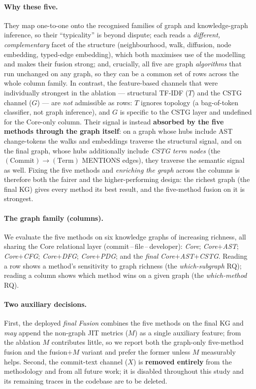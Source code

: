 \documentclass[11pt,a4paper]{article}
\newcommand{\edge}[1]{\textsc{#1}}
\begin{document}
	\paragraph{Why these five.} They map one-to-one onto the recognised families of
	graph and knowledge-graph inference, so their ``typicality'' is beyond dispute;
	each reads a \emph{different, complementary} facet of the structure
	(neighbourhood, walk, diffusion, node embedding, typed-edge embedding), which
	both maximises use of the modelling and makes their fusion strong; and, crucially,
	all five are graph \emph{algorithms} that run unchanged on any graph, so they can
	be a common set of rows across the whole column family. In contrast, the
	feature-based channels that were individually strongest in the ablation ---
	structural TF-IDF ($T$) and the CSTG channel ($G$) --- are \emph{not} admissible
	as rows: $T$ ignores topology (a bag-of-token classifier, not graph inference),
	and $G$ is specific to the CSTG layer and undefined for the Core-only column.
	Their signal is instead \textbf{absorbed by the five methods through the graph
	itself}: on a graph whose hubs include AST change-tokens the walks and embeddings
	traverse the structural signal, and on the final graph, whose hubs additionally
	include \emph{CSTG term nodes} (the $(\text{Commit})\!\rightarrow\!(\text{Term})$
	\edge{MENTIONS} edges), they traverse the semantic signal as well. Fixing the five
	methods and \emph{enriching the graph} across the columns is therefore both the
	fairer and the higher-performing design: the richest graph (the final KG) gives
	every method its best result, and the five-method fusion on it is strongest.

	\paragraph{The graph family (columns).} We evaluate the five methods on six
	knowledge graphs of increasing richness, all sharing the Core relational layer
	(commit\,--\,file\,--\,developer):
	\emph{Core}; \emph{Core$+$AST}; \emph{Core$+$CFG}; \emph{Core$+$DFG};
	\emph{Core$+$PDG}; and the \emph{final} \emph{Core$+$AST$+$CSTG}. Reading a row
	shows a method's sensitivity to graph richness (the \emph{which-subgraph} RQ);
	reading a column shows which method wins on a given graph (the
	\emph{which-method} RQ).

	\paragraph{Two auxiliary decisions.} First, the deployed \emph{final Fusion}
	combines the five methods on the final KG and \emph{may} append the non-graph JIT
	metrics ($M$) as a single auxiliary feature; from the ablation $M$ contributes
	little, so we report both the graph-only five-method fusion and the
	fusion$+M$ variant and prefer the former unless $M$ measurably helps. Second, the
	commit-text channel ($X$) is \textbf{removed entirely} from the methodology and
	from all future work; it is disabled throughout this study and its remaining
	traces in the codebase are to be deleted.
\end{document}
